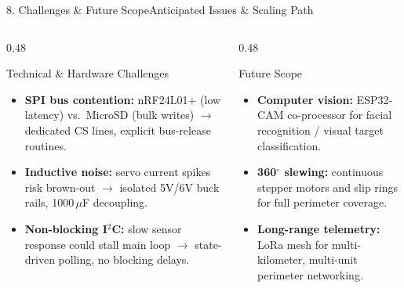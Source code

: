 \documentclass[aspectratio=169, 10pt]{beamer}
\begin{document}
\begin{frame}{8. Challenges \& Future Scope}{Anticipated Issues \& Scaling Path}
    \begin{columns}[T]
        \begin{column}{0.48\textwidth}
            \begin{block}{Technical \& Hardware Challenges}
                \footnotesize
                \begin{itemize}
                    \item \textbf{SPI bus contention:} nRF24L01+ (low latency) vs.\ MicroSD (bulk writes) $\rightarrow$ dedicated CS lines, explicit bus-release routines.
                    \item \textbf{Inductive noise:} servo current spikes risk brown-out $\rightarrow$ isolated 5V/6V buck rails, 1000\,$\mu$F decoupling.
                    \item \textbf{Non-blocking I$^2$C:} slow sensor response could stall main loop $\rightarrow$ state-driven polling, no blocking delays.
                \end{itemize}
            \end{block}
        \end{column}
        \begin{column}{0.48\textwidth}
            \begin{block}{Future Scope}
                \footnotesize
                \begin{itemize}
                    \item \textbf{Computer vision:} ESP32-CAM co-processor for facial recognition / visual target classification.
                    \item \textbf{360$^\circ$ slewing:} continuous stepper motors and slip rings for full perimeter coverage.
                    \item \textbf{Long-range telemetry:} LoRa mesh for multi-kilometer, multi-unit perimeter networking.
                \end{itemize}
            \end{block}
        \end{column}
    \end{columns}
\end{frame}
\end{document}
